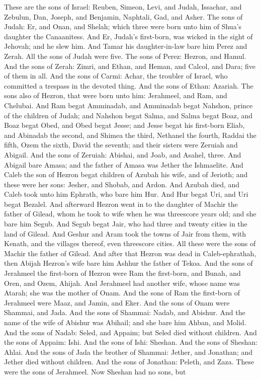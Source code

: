 These are the sons of Israel: Reuben, Simeon, Levi, and Judah, Issachar, and Zebulun, Dan, Joseph, and Benjamin, Naphtali, Gad, and Asher.  The sons of Judah: Er, and Onan, and Shelah; which three were born unto him of Shua’s daughter the Canaanitess. And Er, Judah’s first-born, was wicked in the sight of Jehovah; and he slew him. And Tamar his daughter-in-law bare him Perez and Zerah. All the sons of Judah were five.  The sons of Perez: Hezron, and Hamul. And the sons of Zerah: Zimri, and Ethan, and Heman, and Calcol, and Dara; five of them in all. And the sons of Carmi: Achar, the troubler of Israel, who committed a trespass in the devoted thing. And the sons of Ethan: Azariah.  The sons also of Hezron, that were born unto him: Jerahmeel, and Ram, and Chelubai. And Ram begat Amminadab, and Amminadab begat Nahshon, prince of the children of Judah; and Nahshon begat Salma, and Salma begat Boaz, and Boaz begat Obed, and Obed begat Jesse; and Jesse begat his first-born Eliab, and Abinadab the second, and Shimea the third, Nethanel the fourth, Raddai the fifth, Ozem the sixth, David the seventh; and their sisters were Zeruiah and Abigail. And the sons of Zeruiah: Abishai, and Joab, and Asahel, three. And Abigail bare Amasa; and the father of Amasa was Jether the Ishmaelite.  And Caleb the son of Hezron begat children of Azubah his wife, and of Jerioth; and these were her sons: Jesher, and Shobab, and Ardon. And Azubah died, and Caleb took unto him Ephrath, who bare him Hur. And Hur begat Uri, and Uri begat Bezalel.  And afterward Hezron went in to the daughter of Machir the father of Gilead, whom he took to wife when he was threescore years old; and she bare him Segub. And Segub begat Jair, who had three and twenty cities in the land of Gilead. And Geshur and Aram took the towns of Jair from them, with Kenath, and the villages thereof, even threescore cities. All these were the sons of Machir the father of Gilead. And after that Hezron was dead in Caleb-ephrathah, then Abijah Hezron’s wife bare him Ashhur the father of Tekoa.  And the sons of Jerahmeel the first-born of Hezron were Ram the first-born, and Bunah, and Oren, and Ozem, Ahijah. And Jerahmeel had another wife, whose name was Atarah; she was the mother of Onam. And the sons of Ram the first-born of Jerahmeel were Maaz, and Jamin, and Eker. And the sons of Onam were Shammai, and Jada. And the sons of Shammai: Nadab, and Abishur. And the name of the wife of Abishur was Abihail; and she bare him Ahban, and Molid. And the sons of Nadab: Seled, and Appaim; but Seled died without children. And the sons of Appaim: Ishi. And the sons of Ishi: Sheshan. And the sons of Sheshan: Ahlai. And the sons of Jada the brother of Shammai: Jether, and Jonathan; and Jether died without children. And the sons of Jonathan: Peleth, and Zaza. These were the sons of Jerahmeel. Now Sheshan had no sons, but 
